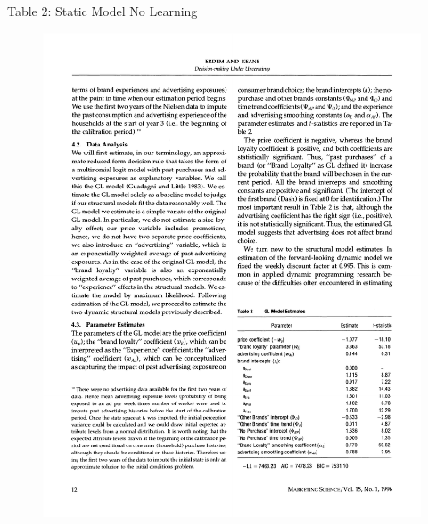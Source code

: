\documentclass[xcolor=pdftex,dvipsnames,table,mathserif]{beamer}
\begin{document}
\begin{frame}{Table 2: Static Model No Learning} 
\begin{figure}[htbp]
\begin{center}
\includegraphics{resources/ek1.pdf}
\label{default}
\end{center}
\end{figure}
\end{frame}
\end{document}
